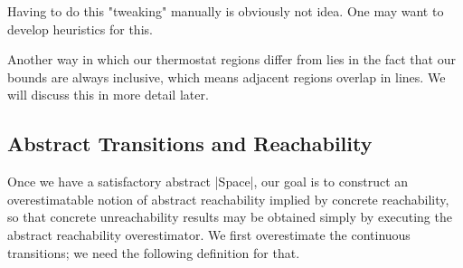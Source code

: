 \documentclass[runningheads]{llncs}
\newcommand{\weg}[1]{}
\begin{document}
{


}
Having to do this "tweaking" manually is obviously not idea. One may want to develop heuristics for this. 
\



Another way in which our thermostat regions differ from \cite{alur}
lies in the fact that our bounds are always inclusive, which means
adjacent regions overlap in lines. We will discuss this in more detail
later.


\weg{ \todo{mention that the reason the space definition could be
    mostly automated is that |regions_cover| is essentially a whole
    bunch of if-then-else's (which are only constructive inside |DN|)}
}

\subsection{Abstract Transitions and Reachability}
\label{abs.reach}


Once we have a satisfactory abstract |Space|, our goal is to construct
an overestimatable notion of abstract reachability implied by concrete
reachability, so that concrete unreachability results may be obtained
simply by executing the abstract reachability overestimator. We first overestimate the continuous transitions; we need the following definition for that.
\end{document}
